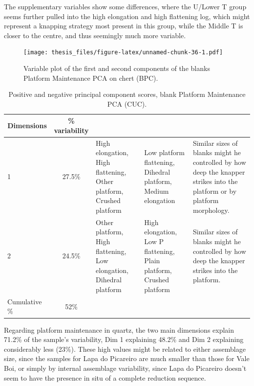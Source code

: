 \documentclass[12pt,twoside]{reedthesis}
\begin{document}
The supplementary variables show some differences, where the U/Lower T group seems further pulled into the high elongation and high flattening log, which might represent a knapping strategy most present in this group, while the Middle T is closer to the centre, and thus seemingly much more variable.
\begin{figure}
\centering
\texttt{[image: thesis\_files/figure-latex/unnamed-chunk-36-1.pdf]}
\caption{\label{fig:unnamed-chunk-36}Variable plot of the first and second components of the blanks Platform Maintenance PCA on chert (BPC).}
\end{figure}
\begin{table}

\caption{\label{tab:unnamed-chunk-37}Positive and negative principal component scores, blank Platform Maintenance PCA (CUC).}
\centering
\begin{tabular}[t]{lc>{\raggedright\arraybackslash}p{3cm}>{\raggedright\arraybackslash}p{3cm}>{\raggedright\arraybackslash}p{3cm}}
\toprule
\multicolumn{1}{c}{\textbf{Dimensions}} & \multicolumn{1}{c}{\textbf{\% variability}} & \multicolumn{1}{>{\centering\arraybackslash}p{3cm}}{\textbf{+}} & \multicolumn{1}{>{\centering\arraybackslash}p{3cm}}{\textbf{-}} & \multicolumn{1}{>{\centering\arraybackslash}p{3cm}}{\textbf{Interpretation}}\\
\midrule
1 & 27.5\% & High elongation, High flattening, Other platform, Crushed platform & Low platform flattening, Dihedral platform, Medium elongation & Similar sizes of blanks might he controlled by how deep the knapper strikes into the platform or by platform morphology.\\
2 & 24.5\% & Other platform, High flattening, Low elongation, Dihedral platform & High elongation, Low P flattening, Plain platform, Crushed platform & Similar sizes of blanks might he controlled by how deep the knapper strikes into the platform.\\
Cumulative \% & 52\% &  &  & \\
\bottomrule
\end{tabular}
\end{table}
Regarding platform maintenance in quartz, the two main dimensions explain 71.2\% of the sample's variability, Dim 1 explaining 48.2\% and Dim 2 explaining considerably less (23\%). These high values might be related to either assemblage size, since the samples for Lapa do Picareiro are much smaller than those for Vale Boi, or simply by internal assemblage variability, since Lapa do Picareiro doesn't seem to have the presence in situ of a complete reduction sequence.
\end{document}
